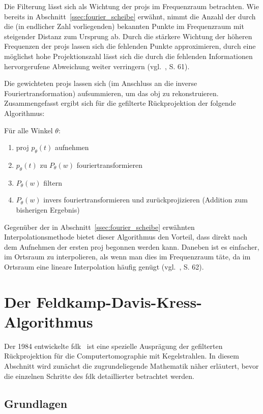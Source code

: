 Die Filterung lässt sich als Wichtung der \glspl{proj} im Frequenzraum betrachten. Wie bereits in
Abschnitt~\ref{ssec:fourier_scheibe} erwähnt, nimmt die Anzahl der durch die (in endlicher Zahl vorliegenden) bekannten
Punkte im Frequenzraum mit steigender Distanz zum Ursprung ab. Durch die stärkere Wichtung der höheren Frequenzen der
\glspl{proj} lassen sich die fehlenden Punkte approximieren, durch eine möglichst hohe Projektionszahl lässt sich die
durch die fehlenden Informationen hervorgerufene Abweichung weiter verringern (vgl.~\cite{kakslan}, S. 61).

Die gewichteten \glspl{proj} lassen sich (im Anschluss an die inverse Fouriertransformation) aufsummieren, um das
\gls{obj} zu rekonstruieren. Zusammengefasst ergibt sich für die gefilterte Rückprojektion der folgende Algorithmus:

Für alle Winkel $\theta$:
\begin{enumerate}
    \item \gls{proj} $p_{\theta}(t)$ aufnehmen
    \item $p_{\theta}(t)$ zu $P_{\theta}(w)$ fouriertransformieren
    \item $P_{\theta}(w)$ filtern
    \item $P_{\theta}(w)$ invers fouriertransformieren und zurückprojizieren (Addition zum bisherigen Ergebnis)
\end{enumerate}

Gegenüber der in Abschnitt~\ref{ssec:fourier_scheibe} erwähnten Interpolationsmethode bietet dieser Algorithmus den
Vorteil, dass direkt nach dem Aufnehmen der ersten \gls{proj} begonnen werden kann. Daneben ist es einfacher, im
Ortsraum zu interpolieren, als wenn man dies im Frequenzraum täte, da im Ortsraum eine lineare Interpolation häufig
genügt (vgl.~\cite{kakslan}, S. 62).

\section{Der Feldkamp-Davis-Kress-Algorithmus}\label{sec:fdk}

Der 1984 entwickelte \gls{fdk}~\cite{fdk} ist eine spezielle Ausprägung der gefilterten Rückprojektion für die
Computertomographie mit Kegelstrahlen. In diesem Abschnitt wird zunächst die zugrundeliegende Mathematik näher
erläutert, bevor die einzelnen Schritte des \gls{fdk} detaillierter betrachtet werden.

\subsection{Grundlagen}\label{ssec:fdk_math}

